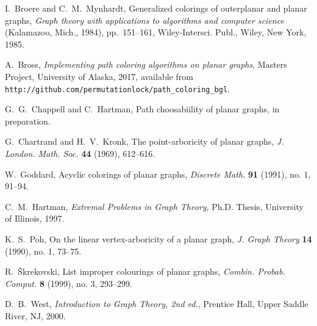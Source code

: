 \documentclass[12pt,letterpaper]{article}
\theoremstyle{plain}
\theoremstyle{definition}
\begin{document}
\begin{thebibliography}{99}

I.~Broere and C.~M.~Mynhardt,
Generalized colorings of outerplanar and planar graphs,
\textit{Graph theory with applications to algorithms and computer science}
 (Kalamazoo, Mich., 1984),
pp.~151--161,
Wiley-Intersci. Publ., Wiley, New York, 1985.

A.~Bross,
\textit{Implementing path coloring algorithms on planar graphs},
Masters Project,
University of Alaska,
2017,
available from\hfil\break
\texttt{http://github.com/permutationlock/path\_coloring\_bgl}.

G.~G.~Chappell and C.~Hartman,
Path choosabiility of planar graphs,
in preparation.

G.~Chartrand and H.~V.~Kronk,
The point-arboricity of planar graphs,
\textit{J. London. Math. Soc.}
\textbf{44} (1969),
612--616.

W.~Goddard,
Acyclic colorings of planar graphs,
\textit{Discrete Math.}
\textbf{91} (1991), no. 1,
91--94.

C.~M.~Hartman,
\textit{Extremal Problems in Graph Theory},
Ph.D. Thesis,
University of Illinois,
1997.

K.~S.~Poh,
On the linear vertex-arboricity of a planar graph,
\textit{J. Graph Theory}
\textbf{14} (1990), no. 1,
73--75.

R.~\v{S}krekovski,
List improper colourings of planar graphs,
\textit{Combin. Probab. Comput.}
\textbf{8} (1999), no. 3,
293--299.

D.~B.~West,
\textit{Introduction to Graph Theory, 2nd ed.},
Prentice Hall,
Upper Saddle River, NJ,
2000.

\end{thebibliography}
\end{document}
